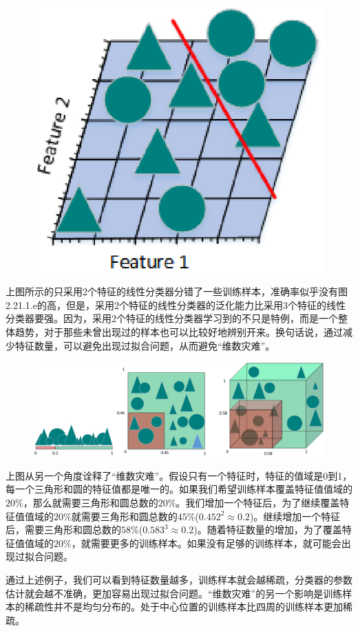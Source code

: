  \begin{figure}[h]
   \centering
   \includegraphics[width=.5\textwidth]{imgs/2.21.1.6a.eps}
 \end{figure}

上图所示的只采用2个特征的线性分类器分错了一些训练样本，准确率似乎没有图2.21.1.e的高，但是，采用2个特征的线性分类器的泛化能力比采用3个特征的线性分类器要强。因为，采用2个特征的线性分类器学习到的不只是特例，而是一个整体趋势，对于那些未曾出现过的样本也可以比较好地辨别开来。换句话说，通过减少特征数量，可以避免出现过拟合问题，从而避免``维数灾难''。

 \begin{figure}[h]
   \centering
   \includegraphics[width=.9\textwidth]{imgs/2.21.1.6.eps}
 \end{figure}

上图从另一个角度诠释了``维数灾难''。假设只有一个特征时，特征的值域是0到1，每一个三角形和圆的特征值都是唯一的。如果我们希望训练样本覆盖特征值值域的$20\%$，那么就需要三角形和圆总数的$20\%$。我们增加一个特征后，为了继续覆盖特征值值域的$20\%$就需要三角形和圆总数的$45\%$($0.452^2\approx0.2$)。继续增加一个特征后，需要三角形和圆总数的$58\%$($0.583^3\approx0.2$)。随着特征数量的增加，为了覆盖特征值值域的$20\%$，就需要更多的训练样本。如果没有足够的训练样本，就可能会出现过拟合问题。


通过上述例子，我们可以看到特征数量越多，训练样本就会越稀疏，分类器的参数估计就会越不准确，更加容易出现过拟合问题。``维数灾难''的另一个影响是训练样本的稀疏性并不是均匀分布的。处于中心位置的训练样本比四周的训练样本更加稀疏。

